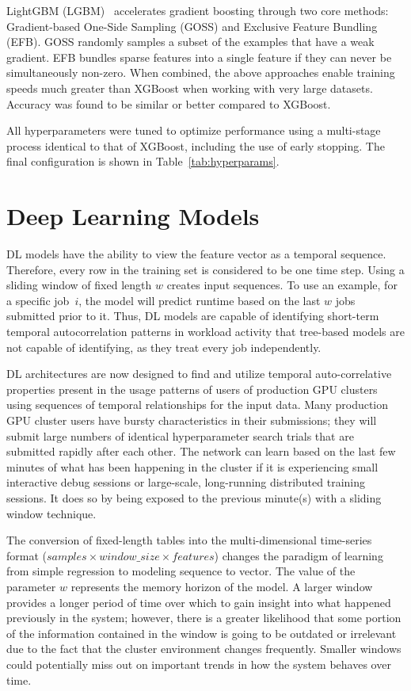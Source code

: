 LightGBM (LGBM)~\cite{ke2017lightgbm} accelerates gradient boosting through two core methods: Gradient-based One-Side Sampling (GOSS) and Exclusive Feature Bundling (EFB). GOSS randomly samples a subset of the examples that have a weak gradient. EFB bundles sparse features into a single feature if they can never be simultaneously non-zero. When combined, the above approaches enable training speeds much greater than XGBoost when working with very large datasets. Accuracy was found to be similar or better compared to XGBoost.

All hyperparameters were tuned to optimize performance using a multi-stage process identical to that of XGBoost, including the use of early stopping. The final configuration is shown in Table~\ref{tab:hyperparams}.

\section{Deep Learning Models}
\label{sec:deeplearning}

DL models have the ability to view the feature vector as a temporal sequence. Therefore, every row in the training set is considered to be one time step. Using a sliding window of fixed length $w$ creates input sequences. To use an example, for a specific job~$i$, the model will predict runtime based on the last $w$ jobs submitted prior to it. Thus, DL models are capable of identifying short-term temporal autocorrelation patterns in workload activity that tree-based models are not capable of identifying, as they treat every job independently.

DL architectures are now designed to find and utilize temporal auto-correlative properties present in the usage patterns of users of production GPU clusters using sequences of temporal relationships for the input data. Many production GPU cluster users have bursty characteristics in their submissions; they will submit large numbers of identical hyperparameter search trials that are submitted rapidly after each other. The network can learn based on the last few minutes of what has been happening in the cluster if it is experiencing small interactive debug sessions or large-scale, long-running distributed training sessions. It does so by being exposed to the previous minute(s) with a sliding window technique.

The conversion of fixed-length tables into the multi-dimensional time-series format ($samples \times window\_size \times features$) changes the paradigm of learning from simple regression to modeling sequence to vector. The value of the parameter $w$ represents the memory horizon of the model. A larger window provides a longer period of time over which to gain insight into what happened previously in the system; however, there is a greater likelihood that some portion of the information contained in the window is going to be outdated or irrelevant due to the fact that the cluster environment changes frequently. Smaller windows could potentially miss out on important trends in how the system behaves over time.

